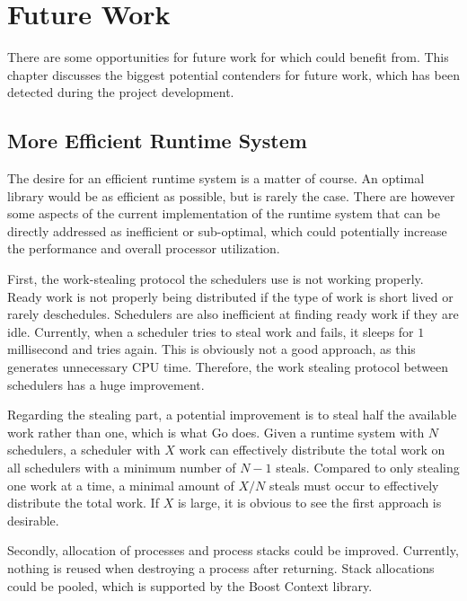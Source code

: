 

\chapter{Future Work}
\label{ch:future_work}


There are some opportunities for future work for which \Proxc{} could benefit from. This chapter discusses the biggest potential contenders for future work, which has been detected during the project development.


\section{More Efficient Runtime System}


The desire for an efficient runtime system is a matter of course. An optimal library would be as efficient as possible, but is rarely the case. There are however some aspects of the current implementation of the runtime system that can be directly addressed as inefficient or sub\hyp{}optimal, which could potentially increase the performance and overall processor utilization.

First, the work\hyp{}stealing protocol the schedulers use is not working properly. Ready work is not properly being distributed if the type of work is short lived or rarely deschedules. Schedulers are also inefficient at finding ready work if they are idle. Currently, when a scheduler tries to steal work and fails, it sleeps for $1$ millisecond and tries again. This is obviously not a good approach, as this generates unnecessary CPU time. Therefore, the work stealing protocol between schedulers has a huge improvement.

Regarding the stealing part, a potential improvement is to steal half the available work rather than one, which is what Go does. Given a runtime system with $N$ schedulers, a scheduler with $X$ work can effectively distribute the total work on all schedulers with a minimum number of $N-1$ steals. Compared to only stealing one work at a time, a minimal amount of $X/N$ steals must occur to effectively distribute the total work. If $X$ is large, it is obvious to see the first approach is desirable.

Secondly, allocation of processes and process stacks could be improved. Currently, nothing is reused when destroying a process after returning. Stack allocations could be pooled, which is supported by the Boost Context library. 

